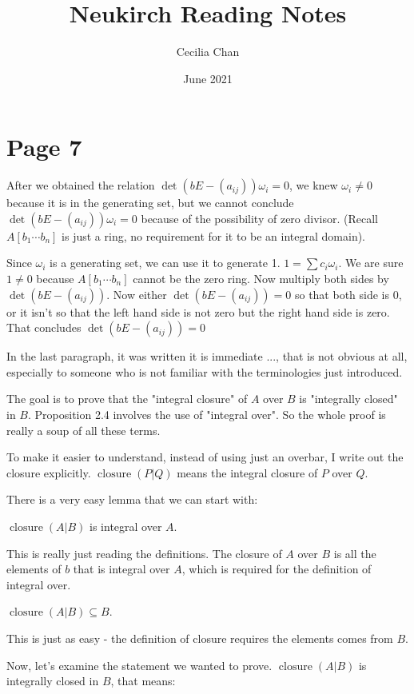 \documentclass{article}
\title{Neukirch Reading Notes}
\author{Cecilia Chan}
\date{June 2021}
\DeclareMathOperator{\closure}{closure}
\begin{document}
\maketitle

\section*{Page 7}
After we obtained the relation $ \det(bE - (a_{ij}))\omega_i = 0 $, we knew $ \omega_i \ne 0 $ because it is in the generating set, but we cannot conclude $ \det(bE - (a_{ij}))\omega_i = 0 $ because of the possibility of zero divisor. (Recall $ A[b_1 \cdots b_n] $ is just a ring, no requirement for it to be an integral domain).

Since $ \omega_i $ is a generating set, we can use it to generate 1. $ 1 = \sum c_i \omega_i $. We are sure $ 1 \ne 0 $ because $ A[b_1 \cdots b_n ] $ cannot be the zero ring. Now multiply both sides by $ \det(bE - (a_{ij})) $. Now either $ \det(bE - (a_{ij})) = 0 $ so that both side is 0, or it isn't so that the left hand side is not zero but the right hand side is zero. That concludes $ \det(bE - (a_{ij})) = 0 $

In the last paragraph, it was written it is immediate ..., that is not obvious at all, especially to someone who is not familiar with the terminologies just introduced.

The goal is to prove that the "integral closure" of $ A $ over $ B $ is "integrally closed" in $ B $. Proposition 2.4 involves the use of "integral over". So the whole proof is really a soup of all these terms.

To make it easier to understand, instead of using just an overbar, I write out the closure explicitly. $ \closure(P|Q) $ means the integral closure of $ P $ over $ Q $.

There is a very easy lemma that we can start with:

$ \closure(A | B) $ is integral over $ A $.

This is really just reading the definitions. The closure of $ A $ over $ B $ is all the elements of $ b $ that is integral over $ A $, which is required for the definition of integral over.

$ \closure(A | B) \subseteq B $.

This is just as easy - the definition of closure requires the elements comes from $ B $.

Now, let's examine the statement we wanted to prove. $ \closure(A | B) $ is integrally closed in $ B $, that means:
\end{document}
